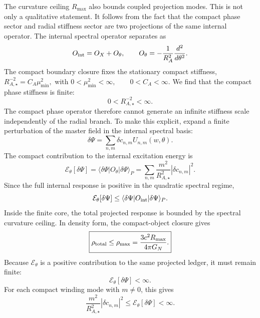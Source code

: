 \documentclass[11pt]{article}
\begin{document}
The curvature ceiling \(R_{\max}\) also bounds coupled projection modes. This
is not only a qualitative statement. It follows from the fact that the compact
phase sector and radial stiffness sector are two projections of the same
internal operator. The internal spectral operator separates as
\begin{equation}
O_{\rm int}
=
O_X+O_\theta,
\qquad
O_\theta
=
-\frac{1}{R_A^2}
\frac{d^2}{d\theta^2}.
\end{equation}
The compact boundary closure fixes the stationary compact stiffness,$R_{A,\star}^{-2}=C_A\mu_{\min}^2,$ with $0<\mu_{\min}^2<\infty, \qquad 0<C_A<\infty.$ We find that the compact phase stiffness is finite:
\begin{equation}
\boxed{
0<R_{A,\star}^{-2}<\infty.
}
\end{equation}
The compact phase operator therefore cannot generate an infinite stiffness
scale independently of the radial branch. To make this explicit, expand a finite perturbation of the master field in the
internal spectral basis:
\begin{equation}
\delta\Psi
=
\sum_{n,m}
\delta c_{n,m}
U_{n,m}(w,\theta).
\end{equation}
The compact contribution to the internal excitation energy is
\begin{equation}
\mathcal E_\theta[\delta\Psi]
=
\langle\delta\Psi|O_\theta|\delta\Psi\rangle_P
=
\sum_{n,m}
\frac{m^2}{R_{A,\star}^2}
|\delta c_{n,m}|^2 .
\end{equation}
Since the full internal response is positive in the quadratic spectral regime,
\begin{equation}
\mathcal E_\theta[\delta\Psi]
\leq
\langle\delta\Psi|O_{\rm int}|\delta\Psi\rangle_P .
\end{equation}
Inside the finite core, the total projected response is bounded by the spectral
curvature ceiling. In density form, the compact-object closure gives
\begin{equation}
\boxed{
\rho_{\rm total}
\leq
\rho_{\max}
=
\frac{3c^2R_{\max}}{4\pi G_N}.
}
\end{equation}
Because \(\mathcal E_\theta\) is a positive contribution to the same projected
ledger, it must remain finite:
\begin{equation}
\boxed{
\mathcal E_\theta[\delta\Psi]<\infty.
}
\end{equation}
For each compact winding mode with \(m\neq0\), this gives
\begin{equation}
\frac{m^2}{R_{A,\star}^2}
|\delta c_{n,m}|^2
\leq
\mathcal E_\theta[\delta\Psi]
<
\infty.
\end{equation}
\end{document}
